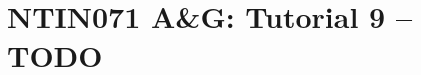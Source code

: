 \documentclass[a4paper,12pt]{amsart}
\begin{document}

\section*{NTIN071 A\&G: Tutorial 9 -- TODO}


\medskip


\medskip
\end{document}
